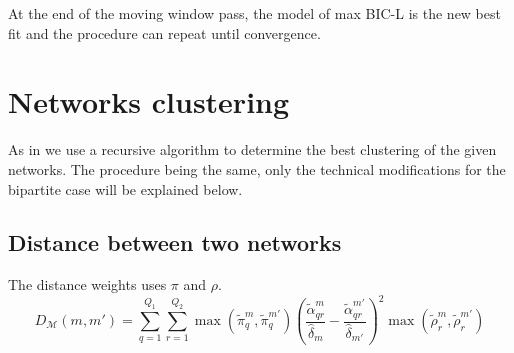\documentclass[12pt,a4paper]{report}
\begin{document}
At the end of the moving window pass, the model of max BIC-L is the new best
fit and the procedure can repeat until convergence.

\section{Networks clustering}
\label{sec:networks-clustering}
As in \parencite{chabert-liddellLearningCommonStructures2023} we use a recursive
algorithm to determine the best clustering of the given networks. The procedure
being the same, only the technical modifications for the bipartite case will be
explained below.
\subsection{Distance between two networks}
\label{ssec:distance-between-two-networks}
The distance weights uses $\pi$ and $\rho$.
\[
    D_{\mathcal{M}}(m,m') = \sum_{q = 1}^{Q_1} \sum_{r = 1}^{Q_2} \max(\widetilde{\pi}_{q}^{m}, \widetilde{\pi}_{q}^{m'}) \left( \frac{\widetilde{\alpha}_{qr}^{m}}{\widehat{\delta}_{m}} - \frac{\widetilde{\alpha}_{qr}^{m'}}{\widehat{\delta}_{m'}}\right)^{2} \max(\widetilde{\rho}_{r}^{m}, \widetilde{\rho}_{r}^{m'})
\]


\printbibliography
\listoffigures
\listoftables
\end{document}
